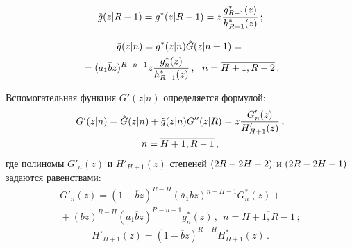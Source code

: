 \begin{multicols}{2}
\noindent
\begin{equation*}
\tilde{g}(z|R-1) = g^*(z|R-1) = z \displaystyle\frac{\displaystyle g^*_{R-1}(z) \mathstrut}{\displaystyle h^*_{R-1}(z)\mathstrut}\,;
\end{equation*}


\noindent
\begin{multline*}
\tilde{g}(z|n) = g^*(z|n) \tilde{G}(z|n+1)
={}\\
{}=
(a_1 \overline{b} z)^{R-n-1} z \displaystyle\frac{\displaystyle g^*_n(z) \mathstrut}{\displaystyle  h^*_{R-1}(z)\mathstrut}\,,\ \
n=\overline{H+1,R-2}\,.
\end{multline*}

Вспомогательная функция $G'(z|n)$ определяется формулой:
\begin{multline*}
G'(z|n) = \tilde{G}(z|n) + \tilde{g}(z|n) G''(z|R) =
z \displaystyle\frac{\displaystyle G'_{n}(z)\mathstrut}{\displaystyle  H'_{H+1}(z)\mathstrut}\,,\\
n=\overline{H+1,R-1}\,,
\end{multline*}
где полиномы $G'_{n}(z)$ и $H'_{H+1}(z)$
степеней $(2R\hm-2H\hm-2)$ и $(2R\hm-2H\hm-1)$ задаются равенствами:
\begin{multline*}
G'_n(z) = (1 - \overline{b} z)^{R-H} (\overline{a}_1 b z)^{n-H-1}
G^*_{n}(z) + {}\\
{}+(b z)^{R-H} (a_1 \overline{b} z)^{R-n-1} g^*_{n}(z) \,,\ \ n=\overline{H+1,R-1}\,;
\end{multline*}
\begin{equation*}
H'_{H+1}(z) = (1 - \overline{b} z)^{R-H} H^*_{H+1}(z) \,.
\end{equation*}


\end{multicols}
